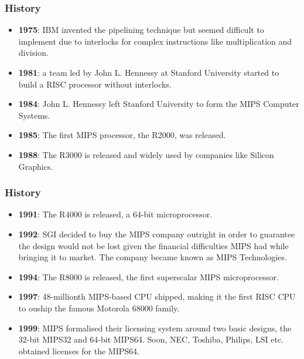 
\begin{frame}
  \frametitle{History}

  \begin{itemize}
    \item
      \textbf{1975}: IBM invented the pipelining technique but seemed
      difficult to implement due to interlocks for complex instructions like
      multiplication and division.
    \item
      \textbf{1981}: a team led by John L. Hennessy at Stanford University
      started to build a RISC processor without interlocks.
    \item
      \textbf{1984}: John L. Hennessy left Stanford University to form
      the MIPS Computer Systems.
    \item
      \textbf{1985}: The first MIPS processor, the R2000, was released.
    \item
      \textbf{1988}: The R3000 is released and widely used by companies like
      Silicon Graphics.
  \end{itemize}
\end{frame}


\begin{frame}
  \frametitle{History}

  \begin{itemize}
    \item
      \textbf{1991}: The R4000 is released, a 64-bit microprocessor.
    \item
      \textbf{1992}: SGI decided to buy the MIPS company outright in order
      to guarantee the design would not be lost given the financial
      difficulties MIPS had while bringing it to market. The company became
      known as MIPS Technologies.
    \item
      \textbf{1994}: The R8000 is released, the first superscalar
      MIPS microprocessor.
    \item
      \textbf{1997}: 48-millionth MIPS-based CPU shipped, making it the
      first RISC CPU to ouship the famous Motorola 68000 family.
    \item
      \textbf{1999}: MIPS formalised their licensing system around two
      basic designs, the 32-bit MIPS32 and 64-bit MIPS64. Soon, NEC, Toshiba,
      Philips, LSI etc. obtained licenses for the MIPS64.
  \end{itemize}
\end{frame}


